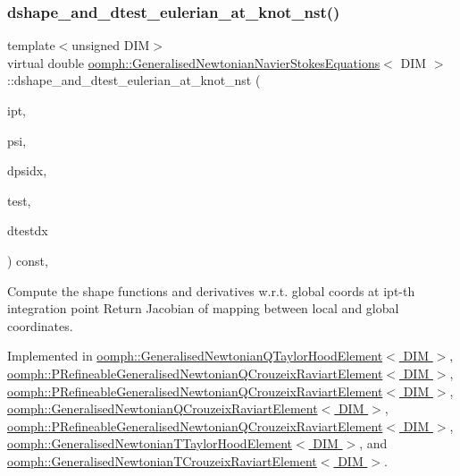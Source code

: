 \subsubsection{\texorpdfstring{dshape\+\_\+and\+\_\+dtest\+\_\+eulerian\+\_\+at\+\_\+knot\+\_\+nst()}{dshape\_and\_dtest\_eulerian\_at\_knot\_nst()}\hspace{0.1cm}{\footnotesize\ttfamily [1/2]}}
{\footnotesize\ttfamily template$<$unsigned D\+IM$>$ \\
virtual double \hyperlink{classoomph_1_1GeneralisedNewtonianNavierStokesEquations}{oomph\+::\+Generalised\+Newtonian\+Navier\+Stokes\+Equations}$<$ D\+IM $>$\+::dshape\+\_\+and\+\_\+dtest\+\_\+eulerian\+\_\+at\+\_\+knot\+\_\+nst (\begin{DoxyParamCaption}\item[{const unsigned \&}]{ipt,  }\item[{\hyperlink{classoomph_1_1Shape}{Shape} \&}]{psi,  }\item[{\hyperlink{classoomph_1_1DShape}{D\+Shape} \&}]{dpsidx,  }\item[{\hyperlink{classoomph_1_1Shape}{Shape} \&}]{test,  }\item[{\hyperlink{classoomph_1_1DShape}{D\+Shape} \&}]{dtestdx }\end{DoxyParamCaption}) const\hspace{0.3cm}{\ttfamily [protected]}, {}}



Compute the shape functions and derivatives w.\+r.\+t. global coords at ipt-\/th integration point Return Jacobian of mapping between local and global coordinates. 



Implemented in \hyperlink{classoomph_1_1GeneralisedNewtonianQTaylorHoodElement_afdcac4f4f58a5f7e525454914a9fa2d3}{oomph\+::\+Generalised\+Newtonian\+Q\+Taylor\+Hood\+Element$<$ D\+I\+M $>$}, \hyperlink{classoomph_1_1PRefineableGeneralisedNewtonianQCrouzeixRaviartElement_a7c700df3e0225e2b5a26441730f5fb51}{oomph\+::\+P\+Refineable\+Generalised\+Newtonian\+Q\+Crouzeix\+Raviart\+Element$<$ D\+I\+M $>$}, \hyperlink{classoomph_1_1PRefineableGeneralisedNewtonianQCrouzeixRaviartElement_a7b223143f207155ce82ddaec2d2d7e1e}{oomph\+::\+P\+Refineable\+Generalised\+Newtonian\+Q\+Crouzeix\+Raviart\+Element$<$ D\+I\+M $>$}, \hyperlink{classoomph_1_1GeneralisedNewtonianQCrouzeixRaviartElement_a8320a0d6ad5e4f9a19ab412fb69c00e7}{oomph\+::\+Generalised\+Newtonian\+Q\+Crouzeix\+Raviart\+Element$<$ D\+I\+M $>$}, \hyperlink{classoomph_1_1PRefineableGeneralisedNewtonianQCrouzeixRaviartElement_a203b2ab3f584e3283f793724b13f1838}{oomph\+::\+P\+Refineable\+Generalised\+Newtonian\+Q\+Crouzeix\+Raviart\+Element$<$ D\+I\+M $>$}, \hyperlink{classoomph_1_1GeneralisedNewtonianTTaylorHoodElement_a70a6f7662439d3e71f1d7fb6a00f6d32}{oomph\+::\+Generalised\+Newtonian\+T\+Taylor\+Hood\+Element$<$ D\+I\+M $>$}, and \hyperlink{classoomph_1_1GeneralisedNewtonianTCrouzeixRaviartElement_a9099e8c7fda89ceb149e4feeb50282bd}{oomph\+::\+Generalised\+Newtonian\+T\+Crouzeix\+Raviart\+Element$<$ D\+I\+M $>$}.



